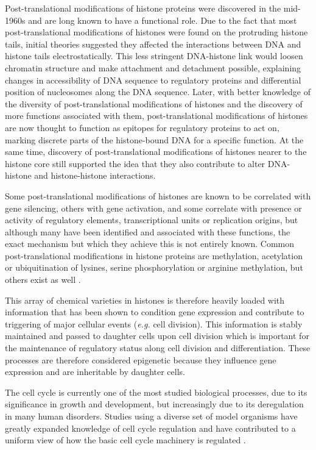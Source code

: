 \documentclass[11pt,twoside,a4paper]{report}
\begin{document}
	Post-translational modifications of histone proteins were discovered in the mid-1960s and are long known to have a functional role. Due to the fact that most post-translational modifications of histones were found on the protruding histone tails, initial theories suggested they affected the interactions between DNA and histone tails electrostatically. This less stringent DNA-histone link would loosen chromatin structure and make attachment and detachment possible, explaining changes in accessibility of DNA sequence to regulatory proteins and differential position of nucleosomes along the DNA sequence. Later, with better knowledge of the diversity of post-translational modifications of histones and the discovery of more functions associated with them, post-translational modifications of histones are now thought to function as epitopes for regulatory proteins to act on, marking discrete parts of the histone-bound DNA for a specific function. At the same time, discovery of post-translational modifications of histones nearer to the histone core still supported the idea that they also contribute to alter DNA-histone and histone-histone interactions.
	 
	Some post-translational modifications of histones are known to be correlated with gene silencing, others with gene activation, and some correlate with presence or activity of regulatory elements, transcriptional units or replication origins, but although many have been identified and associated with these functions, the exact mechanism but which they achieve this is not entirely known. Common post-translational modifications in histone proteins are methylation, acetylation or ubiquitination of lysines, serine phosphorylation or arginine methylation, but others exist as well  \cite{Strahl2000a} \cite{Kouzarides2007} \cite{Bannister2011}.
	 
	This array of chemical varieties in histones is therefore heavily loaded with information that has been shown to condition gene expression and contribute to triggering of major cellular events (\textit{e.g.} cell division). This information is stably maintained and passed to daughter cells upon cell division which is important for the maintenance of regulatory status along cell division and differentiation. These processes are therefore considered epigenetic because they influence gene expression and are inheritable by daughter cells.
		
	The cell cycle is currently one of the most studied biological processes, due to its significance in growth and development, but increasingly due to its deregulation in many human disorders. Studies using a diverse set of model organisms have greatly expanded knowledge of cell cycle regulation and have contributed to a uniform view of how the basic cell cycle machinery is regulated  \cite{Raynaud2014a}.
	
\end{document}
